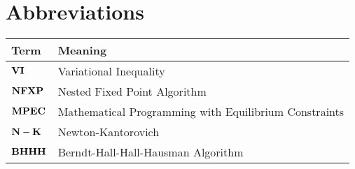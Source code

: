 

\section*{Abbreviations} %
\thispagestyle{plain} %

\phantom{This text will be invisible}
\hspace{20cm}



\begin{table}[H]
	\centering
	\renewcommand{\arraystretch}{1.2}%
	\begin{tabular}{@{}ll@{}}
		\toprule
	Term\phantom{space}	& Meaning \\ \midrule
		$\bold{VI}$	& Variational Inequality \\
		$\bold{NFXP}$	& Nested Fixed Point Algorithm \\
		$\bold{MPEC}$	& Mathematical Programming with Equilibrium Constraints \\
		$\bold{N-K}$	& Newton-Kantorovich \\
		$\bold{BHHH}$	& Berndt-Hall-Hall-Hausman Algorithm \\
 \bottomrule
	\end{tabular}
\end{table}